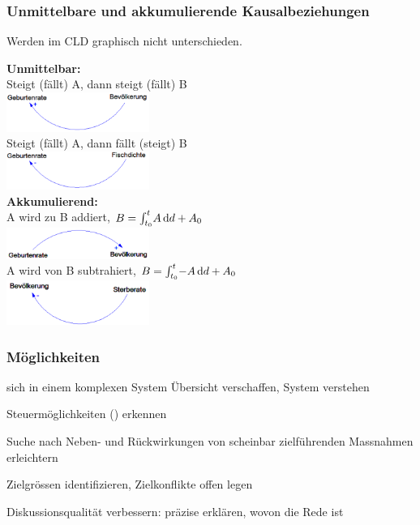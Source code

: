 \subsubsection{Unmittelbare und akkumulierende Kausalbeziehungen}
Werden im CLD graphisch nicht unterschieden.
\begin{multicols}{2}
	\textbf{Unmittelbar:} \\
	Steigt (fällt) A, dann steigt (fällt) B \\
	\includegraphics[width=0.35\textwidth]{pictures/unmittelbar_1} \\
	Steigt (fällt) A, dann fällt (steigt) B \\
	\includegraphics[width=0.35\textwidth]{pictures/unmittelbar_2} \\
	\textbf{Akkumulierend:} \\
	A wird zu B addiert, $B=\int_{t_0}^{t} \! {A} \, \mathrm{d}{d}+A_0$\\
	\includegraphics[width=0.35\textwidth]{pictures/akkumulierend_1} \\
	A wird von B subtrahiert, $B=\int_{t_0}^{t} \! {-A} \, \mathrm{d}{d}+A_0$\\
	\includegraphics[width=0.35\textwidth]{pictures/akkumulierend_2}
\end{multicols}	

\subsubsection{Möglichkeiten}
\begin{compactitem}
	\item sich in einem komplexen System Übersicht verschaffen, System verstehen
	\item Steuermöglichkeiten () erkennen
	\item Suche nach Neben- und Rückwirkungen von scheinbar zielführenden Massnahmen erleichtern
	\item Zielgrössen identifizieren, Zielkonflikte offen legen
	\item Diskussionsqualität verbessern: präzise erklären, wovon die Rede ist
\end{compactitem}


